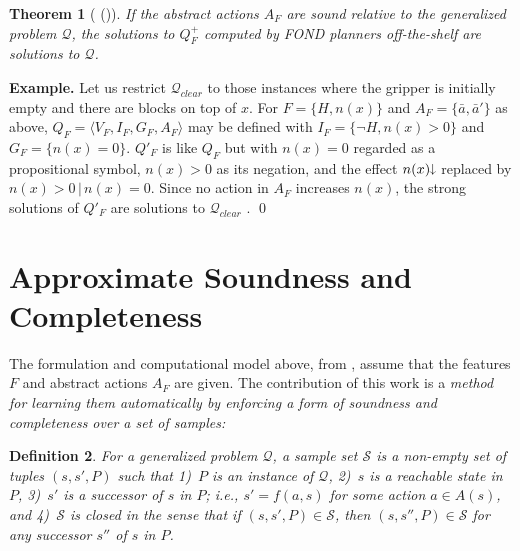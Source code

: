 \documentclass[letterpaper]{article} %
\newcommand{\tup}[1]{\langle #1 \rangle}
\newcommand{\citeay}[1]{\citeauthor{#1} (\citeyear{#1})}
\newtheorem{definition}{Definition}
\newtheorem{theorem}[definition]{Theorem}
\newenvironment{example}{\noindent\textbf{Example.}\xspace}{\qed}
\newcommand{\Q}{\mathcal{Q}}
\renewcommand{\S}{\mathcal{S}}
\newcommand{\mminus}{\hspace{-.05em}\raisebox{.15ex}{\footnotesize$\downarrow$}}
\begin{document}
\begin{theorem}[\citeay{bonet:ijcai2018}]
If the abstract actions  $A_F$ are sound relative to the generalized problem $\Q$, the  solutions  to $Q^+_F$
computed by FOND planners off-the-shelf  are solutions to $\Q$.
\end{theorem}

\medskip
\begin{example}
  Let us restrict  $\Q_{clear}$  to those  instances where  the gripper is initially empty
  and there are blocks on top of $x$. For $F=\{H,n(x)\}$  and $A_F=\{\bar{a},\bar{a}'\}$ as above, 
  $Q_F=\tup{V_F,I_F,G_F,A_F}$ may be defined with $I_F=\{\neg H, n(x) > 0\}$ and $G_F=\{n(x)=0\}$.
  $Q'_F$ is like $Q_F$ but with $n(x)=0$ regarded as a propositional symbol, $n(x) > 0$
  as its negation, and the effect $n(x)\mminus$ replaced by  $n(x) > 0 \, | \, n(x)=0$.
  Since  no action in $A_F$ increases $n(x)$, the strong solutions of $Q'_F$
  are solutions to $\Q_{clear}$ \cite{bonet:ijcai2017}.
\end{example}


\section{Approximate Soundness and Completeness}

The formulation and computational model above, from \cite{bonet:ijcai2018}, 
assume that the features $F$ and abstract actions $A_F$ are given.
The contribution of this work is a \emph{method for  learning   them automatically
by enforcing a form of soundness and completeness over a set of samples:}

\begin{definition}
  For a generalized problem $\Q$, a \emph{sample set}  $\S$ is a non-empty set of tuples  $(s,s',P)$
  such that 1)~$P$ is an instance of $\Q$, 2)~$s$ is a reachable state in $P$, 3)~$s'$
  is a successor of $s$ in $P$; i.e., $s'=f(a,s)$ for some action $a \in A(s)$,
  and
  4)~$\S$ is closed in the sense  that if $(s,s',P) \in \S$, then $(s,s'',P) \in \S$  for any successor $s''$ 
  of $s$ in $P$.
\end{definition}
\end{document}
